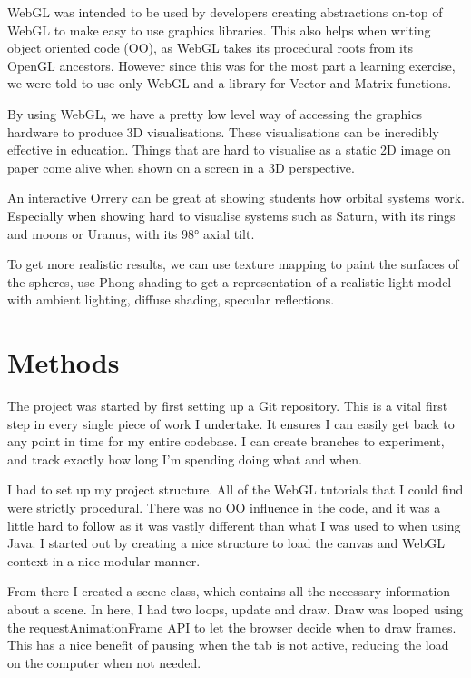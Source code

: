 \documentclass{scrreprt}
\begin{document}
WebGL was intended to be used by developers creating abstractions on-top of WebGL to make easy to use graphics libraries. This also helps when writing object oriented code (OO), as WebGL takes its procedural roots from its OpenGL ancestors. However since this was for the most part a learning exercise, we were told to use only WebGL and a library for Vector and Matrix functions.

By using WebGL, we have a pretty low level way of accessing the graphics hardware to produce 3D visualisations. These visualisations can be incredibly effective in education. Things that are hard to visualise as a static 2D image on paper come alive when shown on a screen in a 3D perspective.

An interactive Orrery can be great at showing students how orbital systems work. Especially when showing hard to visualise systems such as Saturn, with its rings and moons or Uranus, with its \ang{98} axial tilt.

To get more realistic results, we can use texture mapping to paint the surfaces of the spheres, use Phong shading to get a representation of a realistic light model with ambient lighting, diffuse shading, specular reflections.

\chapter{Methods}

The project was started by first setting up a Git repository. This is a vital first step in every single piece of work I undertake. It ensures I can easily get back to any point in time for my entire codebase. I can create branches to experiment, and track exactly how long I'm spending doing what and when.

I had to set up my project structure. All of the WebGL tutorials that I could find were strictly procedural. There was no OO influence in the code, and it was a little hard to follow as it was vastly different than what I was used to when using Java. I started out by creating a nice structure to load the canvas and WebGL context in a nice modular manner.

From there I created a scene class, which contains all the necessary information about a scene. In here, I had two loops, update and draw. Draw was looped using the requestAnimationFrame API to let the browser decide when to draw frames. This has a nice benefit of pausing when the tab is not active, reducing the load on the computer when not needed.
\end{document}

